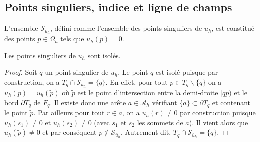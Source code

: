 \subsection*{Points singuliers, indice et ligne de champs}

L'ensemble $\mathcal{S}_{\bar{u}_h}$, défini comme l'ensemble des points singuliers de $\bar{u}_h$, est constitué des points $p \in \Omega_h$ tels que $\bar{u}_h(p) = 0$.
\begin{lemma}
    Les points singuliers de $\bar{u}_h$ sont isolés.
\end{lemma}
\begin{proof}
    Soit $q$ un point singulier de $\bar{u}_h$. Le point $q$ est isolé puisque par construction, on a $T_q\cap\mathcal{S}_{\bar{u}_h}=\{q\}$. En effet, pour tout $p\in T_q\backslash\{q\}$ on a $\bar{u}_h(p)=\bar{u}_h(\widetilde{p})$ où $\widetilde{p}$ est le point d'intersection entre la demi-droite $[qp)$ et le bord $\partial T_q$ de $F_q$. Il existe donc une arête $a\in\mathcal{A}_h$ vérifiant $\{a\}\subset\partial T_q$ et contenant le point $\widetilde{p}$. Par ailleurs pour tout $r\in a$, on a $\bar{u}_h(r)\neq 0$ par construction puisque $\bar{u}_h(s_1)\neq 0$ et $\bar{u}_h(s_2)\neq 0$ (avec $s_1$ et $s_2$ les sommets de $a$). Il vient alors que $\bar{u}_h(\widetilde{p})\neq 0$ et par conséquent $p\notin \mathcal{S}_{\bar{u}_h}$. Autrement dit, $T_q\cap\mathcal{S}_{\bar{u}_h}=\{q\}$.
\end{proof}

